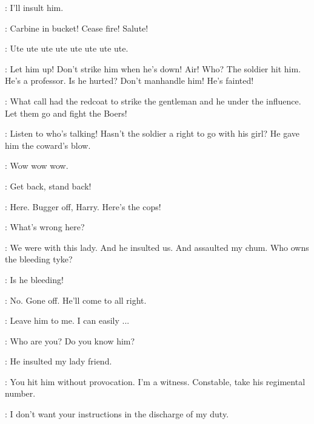 \Carr:
I'll insult him.


\MajorTweedy:
Carbine in bucket!
Cease fire!
Salute!

\Retriever:
Ute ute ute ute ute ute ute ute.

\Crowd:
Let him up!
Don't strike him when he's down!
Air!
Who?
The soldier hit him.
He's a professor.
Is he hurted?
Don't manhandle him!
He's fainted!

\Hag:
What call had the redcoat to strike the gentleman and he under the influence.
Let them go and fight the Boers!

\Bawd:
Listen to who's talking!
Hasn't the soldier a right to go with his girl?
He gave him the coward's blow.


\Retriever:
Wow wow wow.

\Bloom:
Get back, stand back!

\Compton:
Here.
Bugger off, Harry.
Here's the cops!


\FirstWatch:
What's wrong here?

\Compton:
We were with this lady.
And he insulted us.
And assaulted my chum.
Who owns the bleeding tyke?

\Cissy:
Is he bleeding!

\Man:
No.
Gone off.
He'll come to all right.

\Bloom:
Leave him to me.
I can easily ...

\SecondWatch:
Who are you?
Do you know him?

\Carr:
He insulted my lady friend.

\Bloom:
You hit him without provocation.
I'm a witness.
Constable, take his regimental number.

\SecondWatch:
I don't want your instructions in the discharge of my duty.

